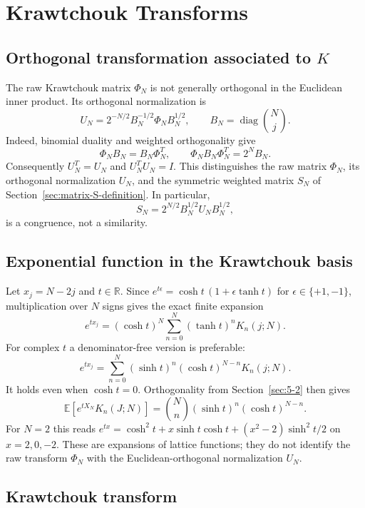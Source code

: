 \chapter{Krawtchouk Transforms}
\label{ch:14}
\section{Orthogonal transformation associated to $K$}
\label{sec:14-1}
The raw Krawtchouk matrix $\Phi_N$ is not generally orthogonal in
the Euclidean inner product. Its orthogonal normalization is
\begin{equation}\label{eq:ency-U-normalization}
U_N=2^{-N/2}B_N^{-1/2}\Phi_NB_N^{1/2},
\qquad B_N=\operatorname{diag}\binom Nj.
\end{equation}
Indeed, binomial duality and weighted orthogonality give
\[
\Phi_NB_N=B_N\Phi_N^T,\qquad
\Phi_NB_N\Phi_N^T=2^NB_N.
\]
Consequently $U_N^T=U_N$ and $U_N^TU_N=I$.
This distinguishes the raw matrix $\Phi_N$, its orthogonal
normalization $U_N$, and the symmetric weighted matrix $S_N$ of
Section~\ref{sec:matrix-S-definition}. In particular,
\[
S_N=2^{N/2}B_N^{1/2}U_NB_N^{1/2},
\]
is a congruence, not a similarity.

\section{Exponential function in the Krawtchouk basis}
\label{sec:14-2}
Let $x_j=N-2j$ and $t\in\mathbb R$. Since
$e^{t\epsilon}=\cosh t\,(1+\epsilon\tanh t)$ for $\epsilon\in\{+1,-1\}$, multiplication over $N$ signs gives the exact finite expansion
\begin{equation}\label{eq:exponential-Krawtchouk-expansion}
e^{tx_j}=(\cosh t)^N\sum_{n=0}^N(\tanh t)^nK_n(j;N).
\end{equation}
For complex $t$ a denominator-free version is preferable:
\[
e^{tx_j}=\sum_{n=0}^N(\sinh t)^n(\cosh t)^{N-n}K_n(j;N).
\]
It holds even when $\cosh t=0$. Orthogonality from Section~\ref{sec:5-2} then gives
\[
\mathbb E[e^{tX_N}K_n(J;N)]=\binom Nn(\sinh t)^n(\cosh t)^{N-n}.
\]
For $N=2$ this reads $e^{tx}=\cosh^2t+x\sinh t\cosh t+(x^2-2)\sinh^2t/2$ on $x=2,0,-2$. These are expansions of lattice functions; they do not identify the raw transform $\Phi_N$ with the Euclidean-orthogonal normalization $U_N$.

\section{Krawtchouk transform}
\label{sec:14-3}
